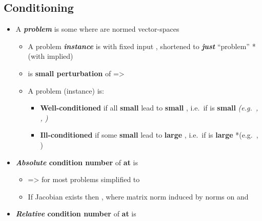 \subsection*{Conditioning}

\begin{itemize}

\item
  A \textbf{\emph{problem}} is some  where 
  are normed vector-spaces

  \begin{itemize}
  
  \item
    A problem \textbf{\emph{instance}} is  with fixed input
    , shortened to \textbf{\emph{just}} ``problem''
    *(with  implied)
  \item
     is \textbf{small perturbation} of 
    =\textgreater{} 
  \item
    A problem (instance) is:

    \begin{itemize}
    
    \item
      \textbf{Well-conditioned} if all \textbf{small} 
      lead to \textbf{small} , i.e.~if \iMbox{\kappa} is
      \textbf{small} \emph{(e.g.~, , )}
    \item
      \textbf{Ill-conditioned} if some \textbf{small} 
      lead to \textbf{large} , i.e.~if \iMbox{\kappa} is
      \textbf{large} *(e.g.~, )
    \end{itemize}
  \end{itemize}
\item
  \textbf{\emph{Absolute} condition number}
   of
  \textbf{ at } is

  \begin{itemize}
  
  \item
    =\textgreater{} for most problems simplified to
  \item
    If Jacobian  exists then
    , where
    matrix norm \iMbox{\lVert - \rVert} induced by norms on 
    and 
  \end{itemize}
\item
  \textbf{\emph{Relative} condition number}
   of \textbf{ at } is


\end{itemize}
